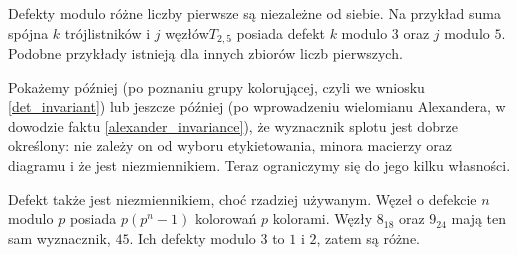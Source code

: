 Defekty modulo różne liczby pierwsze są niezależne od siebie.
Na przykład suma spójna $k$ trójlistników i $j$ węzłów$T_{2,5}$ posiada defekt $k$ modulo $3$ oraz $j$ modulo $5$.
Podobne przykłady istnieją dla innych zbiorów liczb pierwszych.

Pokażemy później (po poznaniu grupy kolorującej, czyli we wniosku \ref{det_invariant}) lub jeszcze później (po wprowadzeniu wielomianu Alexandera, w dowodzie faktu \ref{alexander_invariance}), że wyznacznik splotu jest dobrze określony: nie zależy on od wyboru etykietowania, minora macierzy oraz diagramu i że jest niezmiennikiem.
Teraz ograniczymy się do jego kilku własności.

Defekt także jest niezmiennikiem, choć rzadziej używanym.
Węzeł o defekcie $n$ modulo $p$ posiada $p(p^n-1)$ kolorowań $p$ kolorami.
Węzły $8_{18}$ oraz $9_{24}$ mają ten sam wyznacznik, $45$.
Ich defekty modulo $3$ to $1$ i $2$, zatem są różne.




